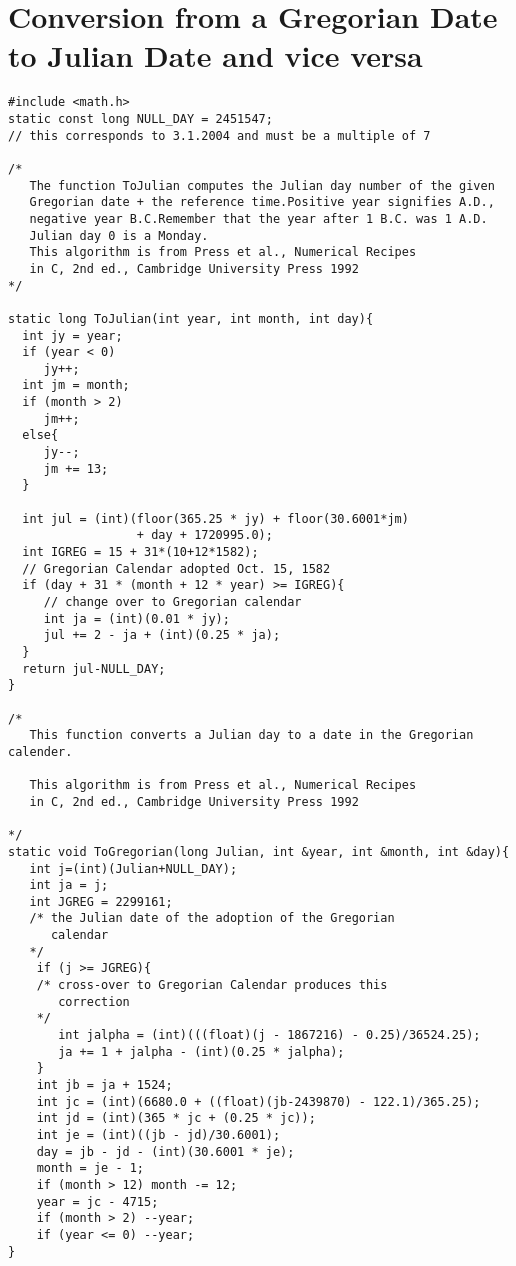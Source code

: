 \documentclass[english,a4paper]{article}
\begin{document}
\appendix

\section{Conversion from a Gregorian Date to Julian Date and vice versa}


\begin{footnotesize}
\begin{verbatim}
#include <math.h>
static const long NULL_DAY = 2451547;
// this corresponds to 3.1.2004 and must be a multiple of 7

/*
   The function ToJulian computes the Julian day number of the given
   Gregorian date + the reference time.Positive year signifies A.D.,
   negative year B.C.Remember that the year after 1 B.C. was 1 A.D.
   Julian day 0 is a Monday.
   This algorithm is from Press et al., Numerical Recipes
   in C, 2nd ed., Cambridge University Press 1992
*/

static long ToJulian(int year, int month, int day){
  int jy = year;
  if (year < 0)
     jy++;
  int jm = month;
  if (month > 2)
     jm++;
  else{
     jy--;
     jm += 13;
  }

  int jul = (int)(floor(365.25 * jy) + floor(30.6001*jm)
                  + day + 1720995.0);
  int IGREG = 15 + 31*(10+12*1582);
  // Gregorian Calendar adopted Oct. 15, 1582
  if (day + 31 * (month + 12 * year) >= IGREG){
     // change over to Gregorian calendar
     int ja = (int)(0.01 * jy);
     jul += 2 - ja + (int)(0.25 * ja);
  }
  return jul-NULL_DAY;
}

/*
   This function converts a Julian day to a date in the Gregorian calender.

   This algorithm is from Press et al., Numerical Recipes
   in C, 2nd ed., Cambridge University Press 1992

*/
static void ToGregorian(long Julian, int &year, int &month, int &day){
   int j=(int)(Julian+NULL_DAY);
   int ja = j;
   int JGREG = 2299161;
   /* the Julian date of the adoption of the Gregorian
      calendar
   */
    if (j >= JGREG){
    /* cross-over to Gregorian Calendar produces this
       correction
    */
       int jalpha = (int)(((float)(j - 1867216) - 0.25)/36524.25);
       ja += 1 + jalpha - (int)(0.25 * jalpha);
    }
    int jb = ja + 1524;
    int jc = (int)(6680.0 + ((float)(jb-2439870) - 122.1)/365.25);
    int jd = (int)(365 * jc + (0.25 * jc));
    int je = (int)((jb - jd)/30.6001);
    day = jb - jd - (int)(30.6001 * je);
    month = je - 1;
    if (month > 12) month -= 12;
    year = jc - 4715;
    if (month > 2) --year;
    if (year <= 0) --year;
}

\end{verbatim}
\end{footnotesize}
\end{document}

